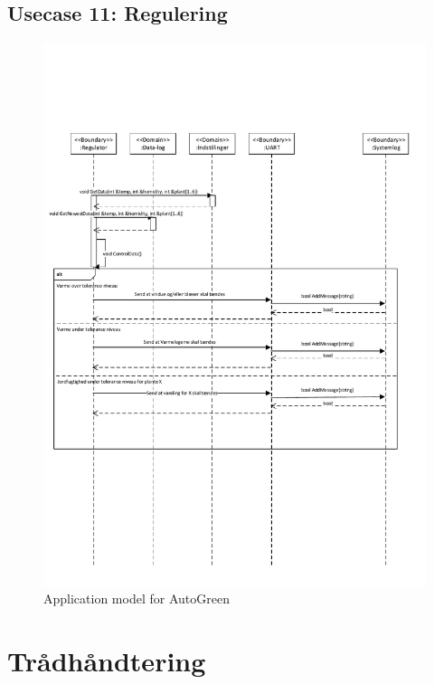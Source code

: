 \clearpage

\subsection{Usecase 11: Regulering}

\begin{figure}[!h]
\centering 
\includegraphics[width={\textwidth-1cm}, trim=0 0 0 0, clip=true]{../fig/SD_autogreen_UC_11_regulering.pdf}
\caption{Application model for AutoGreen}
\label{fig:SD_UC11}
\end{figure}

\clearpage




\section{Trådhåndtering}
